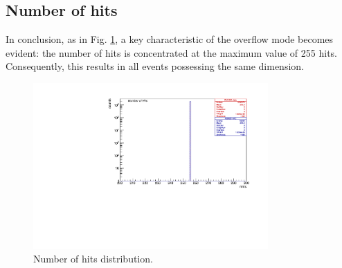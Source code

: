 \subsection{Number of hits}
In conclusion, as in Fig. \ref{fig:3}, a key characteristic of the overflow mode becomes evident: the number of hits is concentrated at the maximum value of 255 hits. Consequently, this results in all events possessing the same dimension.
\begin{figure}[!h]
\centering
\includegraphics[width =0.8\textwidth]{figures/pdf/figure_00008_nhits_281}
\caption{Number of hits distribution.}
\label{fig:3}
\end{figure}


